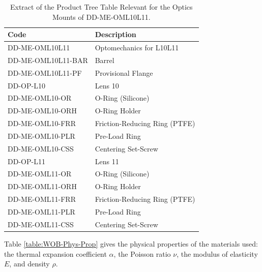 \documentclass{report}
\begin{document}
\begin{table}
\caption{Extract of the Product Tree Table Relevant for the Optics Mounts of DD-ME-OML10L11.}
\label{table:WOB-product-tree3}
\begin{center}
\small
\begin{tabular}{ll}
\hline
\hline
Code                &Description\\
\hline
DD-ME-OML10L11 & Optomechanics for L10L11\\
DD-ME-OML10L11-BAR	&	Barrel	\\
DD-ME-OML10L11-PF	&	Provisional Flange	\\
DD-OP-L10	&	Lens 10	\\
DD-ME-OML10-OR	&	O-Ring (Silicone)	\\
DD-ME-OML10-ORH	&	O-Ring Holder	\\
DD-ME-OML10-FRR	&	Friction-Reducing Ring (PTFE)	\\
DD-ME-OML10-PLR	&	Pre-Load Ring	\\
DD-ME-OML10-CSS	&	Centering Set-Screw	\\
DD-OP-L11	&	Lens 11	\\
DD-ME-OML11-OR	&	O-Ring (Silicone)	\\
DD-ME-OML11-ORH	&	O-Ring Holder	\\
DD-ME-OML11-FRR	&	Friction-Reducing Ring (PTFE)	\\
DD-ME-OML11-PLR	&	Pre-Load Ring	\\
DD-ME-OML11-CSS	&	Centering Set-Screw	\\
\hline
\end{tabular}
\end{center}
\end{table}
Table \ref{table:WOB-Phys-Prop} gives the physical properties of the materials used: the thermal expansion coefficient $\alpha$, the Poisson ratio $\nu$, the modulus of elasticity $E$, and density $\rho$.
\end{document}
